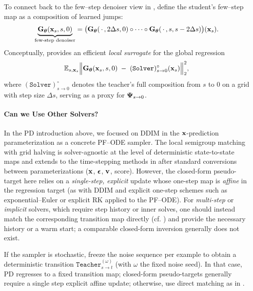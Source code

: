 To connect back to the few–step denoiser view in , define
the student’s few–step map as a composition of learned jumps:
\[
\underbrace{{\mathbf{G}}_{{\bm{\theta}}}({\mathbf{x}}_s, s, 0)}_{\text{few-step denoiser}}
=
\big({\mathbf{G}}_{{\bm{\theta}}}(\,\cdot\,, 2\Delta s, 0)\circ\cdots\circ {\mathbf{G}}_{{\bm{\theta}}}(\,\cdot\,, s, s-2\Delta s)\big)({\mathbf{x}}_s).
\]
Conceptually,  provides an efficient \emph{local surrogate} for the
global regression
\[
\mathbb{E}_{s,{\mathbf{x}}_s}\Big\|{\mathbf{G}}_{{\bm{\theta}}}({\mathbf{x}}_s,s,0)\;-\;(\mathtt{Solver})^{\circ}_{s\to 0}({\mathbf{x}}_s)\Big\|_2^2,
\]
where $(\mathtt{Solver})^{\circ}_{s\to 0}$ denotes the teacher’s full
composition from $s$ to $0$ on a grid with step size $\Delta s$, serving as a
proxy for ${\bm{\Psi}}_{s\to 0}$.

\paragraph{Can we Use Other Solvers?}
In the PD introduction above, we focused on DDIM in the ${\mathbf{x}}$-prediction parameterization as a concrete PF–ODE sampler.
The local semigroup matching with grid halving is solver-agnostic at the level of deterministic state-to-state maps and extends to the time-stepping methods in  after standard conversions between parameterizations (${\mathbf{x}}$, ${\bm{\epsilon}}$, ${\mathbf{v}}$, score).
However, the closed-form pseudo-target here relies on a \emph{single-step, explicit} update whose one-step map is \emph{affine} in the regression target (as with DDIM and explicit one-step schemes such as exponential–Euler or explicit RK applied to the PF–ODE).
For \emph{multi-step} or \emph{implicit} solvers, which require step history or inner solves, one should instead match the corresponding transition map directly (cf. ) and provide the necessary history or a warm start; a comparable closed-form inversion generally does not exist.

If the sampler is stochastic, freeze the noise sequence per example to obtain a deterministic transition
$\mathtt{Teacher}^{(\omega)}_{s\to t}$ (with $\omega$ the fixed noise seed).
In that case, PD regresses to a fixed transition map; closed-form pseudo-targets generally require a single step explicit affine update; otherwise, use direct matching as in .











